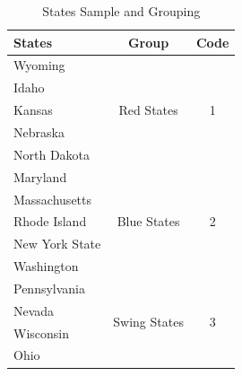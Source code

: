 \begin{table}[H]
  \centering
  \caption{States Sample and Grouping}
  \begin{tabular}{p{7.57em}cc}
    \toprule
    States         & \multicolumn{1}{p{7.93em}}{Group}                    & \multicolumn{1}{p{6.855em}}{Code} \\
    \midrule
    Wyoming        & \multicolumn{1}{c}{\multirow{5}[2]{*}{Red States}}   & \multirow{5}[2]{*}{1}             \\
    Idaho          &                                                      &                                   \\
    Kansas         &                                                      &                                   \\
    Nebraska       &                                                      &                                   \\
    North Dakota   &                                                      &                                   \\
    \midrule
    Maryland       & \multicolumn{1}{c}{\multirow{5}[2]{*}{Blue States}}  & \multirow{5}[2]{*}{2}             \\
    Massachusetts  &                                                      &                                   \\
    Rhode Island   &                                                      &                                   \\
    New York State &                                                      &                                   \\
    Washington     &                                                      &                                   \\
    \midrule
    Pennsylvania   & \multicolumn{1}{c}{\multirow{4}[2]{*}{Swing States}} & \multirow{4}[2]{*}{3}             \\
    Nevada         &                                                      &                                   \\
    Wisconsin      &                                                      &                                   \\
    Ohio           &                                                      &                                   \\
    \bottomrule
  \end{tabular}%
  \label{Table 2.3}%
\end{table}%

